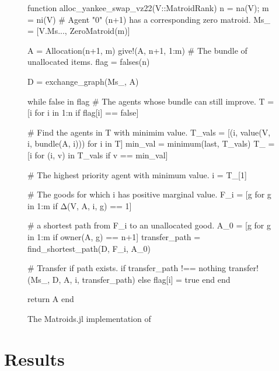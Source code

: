 \begin{figure}[ht!]
\begin{jllisting}
function alloc_yankee_swap_vz22(V::MatroidRank)
  n = na(V); m = ni(V)
  # Agent "0" (n+1) has a corresponding zero matroid.
  Ms_ = [V.Ms..., ZeroMatroid(m)]

  A = Allocation(n+1, m)
  give!(A, n+1, 1:m) # The bundle of unallocated items.
  flag = falses(n)

  D = exchange_graph(Ms_, A)

  while false in flag
    # The agents whose bundle can still improve.
    T = [i for i in 1:n if flag[i] == false]
    
    # Find the agents in T with minimim value.
    T_vals = [(i, value(V, i, bundle(A, i))) for i in T]
    min_val = minimum(last, T_vals)
    T_ = [i for (i, v) in T_vals if v == min_val]

    # The highest priority agent with minimum value.
    i = T_[1] 

    # The goods for which i has positive marginal value.
    F_i = [g for g in 1:m if Δ(V, A, i, g) == 1]

    #  a shortest path from F_i to an unallocated good.
    A_0 = [g for g in 1:m if owner(A, g) == n+1]
    transfer_path = find_shortest_path(D, F_i, A_0)

    # Transfer if path exists.
    if transfer_path !== nothing
      transfer!(Ms_, D, A, i, transfer_path)
    else
      flag[i] = true
    end
  end
  
  return A
end
\end{jllisting}
\caption{The Matroids.jl implementation of }
\label{code:Yankee-Swap}
\end{figure}

\section{Results}
\label{chap:results}